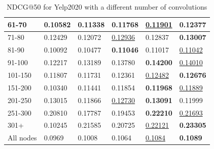 \begin{table}[]
\begin{tabular}{|l|l|l|l|l|l|}
        61-70   & 0.10582                    & 0.11338                    & 0.11768                    & \underline{0.11901}        & \textbf{0.12377}           \\ \hline
        71-80   & 0.12429                    & 0.12072                    & \underline{0.12936}        & 0.12837                    & \textbf{0.13007}           \\ \hline
        81-90   & 0.10092                    & 0.10477                    & \textbf{0.11046}           & 0.11017                    & \underline{0.11042}        \\ \hline
        91-100  & 0.12217                    & 0.13189                    & 0.13780                    & \textbf{0.14200}           & \underline{0.14010}        \\ \hline
        101-150 & 0.11807                    & 0.11731                    & 0.12361                    & \underline{0.12482}        & \textbf{0.12676}           \\ \hline
        151-200 & 0.10340                    & 0.11441                    & 0.11854                    & \textbf{0.11968}           & \underline{0.11889}        \\ \hline
        201-250 & 0.13015                    & 0.11866                    & \underline{0.12730}        & \textbf{0.13091}           & 0.11999                    \\ \hline
        251-300 & 0.20810                    & 0.17787                    & 0.19453                    & \textbf{0.22210}           & \underline{0.21693}        \\ \hline
        301+    & 0.10245                    & 0.21585                    & 0.20725                    & \underline{0.22121}        & \textbf{0.23305}           \\ \hline
        All nodes & 0.0969                     & 0.1008                     & 0.1064                     & \underline{0.1084}         & \textbf{0.1089}            \\ \hline
    \end{tabular}
    \caption{NDCG@50 for Yelp2020 with a different number of convolutions}
    \label{tab:yelp2020-con-evaluation}
\end{table}

